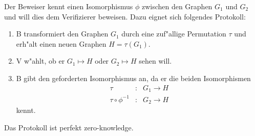 \begin{beispiel}[Graphenisomorphie]
Der Beweiser kennt einen Isomorphismus $\phi$ zwischen den Graphen
$G_1$ und $G_2$ und will dies dem Verifizierer beweisen. Dazu eignet
sich folgendes Protokoll:
\begin{enumerate}
  \item B transformiert den Graphen $G_1$ durch eine zuf"allige 
        Permutation $\tau$ und erh"alt einen neuen Graphen $H=\tau(G_1)$.
  \item V w"ahlt, ob er $G_1 \mapsto H$ oder $G_2 \mapsto H$ sehen will.
  \item B gibt den geforderten Isomorphismus an, da er die beiden Isomorphismen
        \begin{eqnarray*}
          \tau                  & : & G_1 \longrightarrow H \\
          \tau \circ \phi^{-1}  & : & G_2 \longrightarrow H 
        \end{eqnarray*}
        kennt.
\end{enumerate}
Das Protokoll ist perfekt zero-knowledge.
\end{beispiel}




   
  

